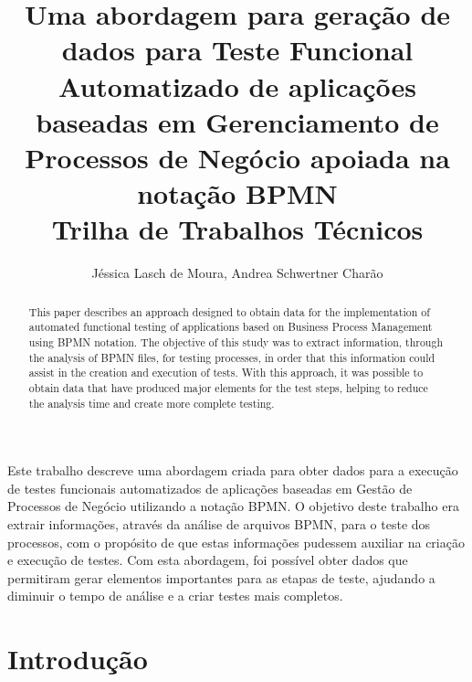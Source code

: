 \documentclass[12pt]{article}
\title{Uma abordagem para geração de dados para Teste Funcional Automatizado de aplicações baseadas em Gerenciamento de Processos de Negócio apoiada na notação BPMN\\ Trilha de Trabalhos Técnicos}
\author{Jéssica Lasch de Moura\inst{1}, Andrea Schwertner Charão\inst{1}}
\begin{document}
 

\maketitle

\begin{abstract}

This paper describes an approach designed to obtain data for the implementation of automated functional testing of applications based on Business Process Management using BPMN notation. The objective of this study was to extract information, through the analysis of BPMN files, for testing processes, in order that this information could assist in the creation and execution of tests. With this approach, it was possible to obtain data that have produced major elements for the test steps, helping to reduce the analysis time and create more complete testing.
\end{abstract}
     
\begin{resumo} 

Este trabalho descreve uma abordagem criada para obter dados para a execução de testes funcionais automatizados de aplicações baseadas em Gestão de Processos de Negócio utilizando a notação BPMN. O objetivo deste trabalho era extrair informações, através da análise de arquivos BPMN, para o teste dos processos, com o propósito de que estas informações pudessem auxiliar na criação e execução de testes. Com esta abordagem, foi possível obter dados que permitiram gerar elementos importantes para as etapas de teste, ajudando a diminuir o tempo de análise e a criar testes mais completos.

\end{resumo}

\section{Introdução}
\end{document}

